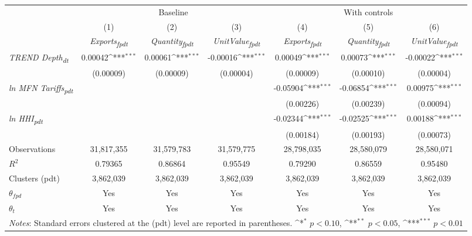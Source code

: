 {
\def\sym#1{\ifmmode^{#1}\else\(^{#1}\)\fi}
\begin{tabular}{l*{6}{c}}
\toprule
&\multicolumn{3}{c}{Baseline}&\multicolumn{3}{c}{With controls}\\\cmidrule(lr){2-4}\cmidrule(lr){5-7}
&(1)&(2)&(3)&(4)&(5)&(6)\\
&\textit{Exports\textsubscript{fpdt}}&\textit{Quantity\textsubscript{fpdt}}&\textit{UnitValue\textsubscript{fpdt}}&\textit{Exports\textsubscript{fpdt}}&\textit{Quantity\textsubscript{fpdt}}&\textit{UnitValue\textsubscript{fpdt}}\\
\midrule
\textit{TREND Depth\textsubscript{dt}} & 0.00042\sym{***} & 0.00061\sym{***} & -0.00016\sym{***} & 0.00049\sym{***} & 0.00073\sym{***} & -0.00022\sym{***}\\
 & (0.00009) & (0.00009) & (0.00004) & (0.00009) & (0.00010) & (0.00004)\\
\addlinespace
\textit{ln MFN Tariffs\textsubscript{pdt}} &  &  &  & -0.05904\sym{***} & -0.06854\sym{***} & 0.00975\sym{***}\\
 &  &  &  & (0.00226) & (0.00239) & (0.00094)\\
\addlinespace
\textit{ln HHI\textsubscript{pdt}} &  &  &  & -0.02344\sym{***} & -0.02525\sym{***} & 0.00188\sym{***}\\
 &  &  &  & (0.00184) & (0.00193) & (0.00073)\\
\midrule
Observations & 31,817,355 & 31,579,783 & 31,579,775 & 28,798,035 & 28,580,079 & 28,580,071\\
$R^{2}$ & 0.79365 & 0.86864 & 0.95549 & 0.79290 & 0.86559 & 0.95480\\
Clusters (pdt) & 3,862,039 & 3,862,039 & 3,862,039 & 3,862,039 & 3,862,039 & 3,862,039\\
$\theta_{fpd}$ & Yes & Yes & Yes & Yes & Yes & Yes\\
$\theta_{t}$ & Yes & Yes & Yes & Yes & Yes & Yes\\
\bottomrule
\multicolumn{7}{l}{\footnotesize \textit{Notes}: Standard errors clustered at the (pdt) level are reported in parentheses. \sym{*} \(p<0.10\), \sym{**} \(p<0.05\), \sym{***} \(p<0.01\)}\\
\end{tabular}
}
